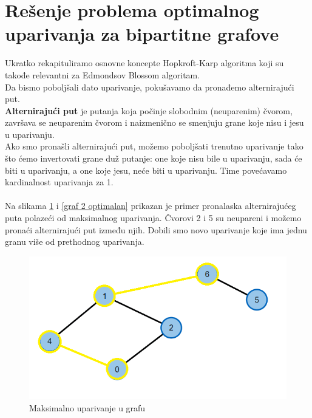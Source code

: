 \documentclass[a4paper]{article}
\theoremstyle{definition}
\begin{document}
\section{Rešenje problema optimalnog uparivanja za bipartitne grafove}	
Ukratko rekapituliramo osnovne koncepte Hopkroft-Karp algoritma koji su takođe relevantni za Edmondsov Blossom algoritam.\\ Da bismo poboljšali dato uparivanje, pokušavamo da pronađemo alternirajući put.\\ \textbf{ Alternirajući put} je putanja koja počinje slobodnim (neuparenim) čvorom, završava se neuparenim čvorom i naizmenično se smenjuju grane koje nisu i jesu u uparivanju. \\Ako smo pronašli alternirajući put, možemo poboljšati trenutno uparivanje tako što ćemo invertovati grane duž putanje: one koje nisu bile u uparivanju, sada će biti u uparivanju, a one koje jesu, neće biti u uparivanju. Time povećavamo kardinalnost uparivanja za 1. \\ \\
Na slikama \ref{graf 2 maksimalan} i \ref{graf 2 optimalan} prikazan je primer pronalaska alternirajućeg puta polazeći od maksimalnog uparivanja. Čvorovi 2 i 5 su neupareni i možemo pronaći alternirajući put između njih. Dobili smo novo uparivanje koje ima jednu granu više od prethodnog uparivanja.
\begin{figure}[H]
\begin{center}
\includegraphics[scale=0.7]{Graf 2 - maksimalan.png}
\end{center}
\caption{Maksimalno uparivanje u grafu}
\label{graf 2 maksimalan}
\end{figure}
\end{document}
